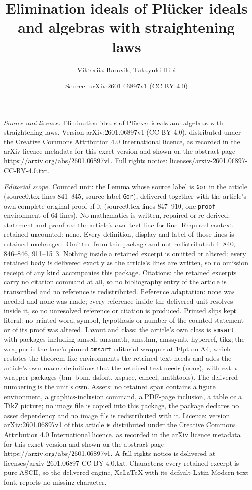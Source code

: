 \documentclass[10pt,a4paper]{amsart}
\title[Elimination ideals of Pl\"ucker ideals and algebras with str]{Elimination ideals of Pl\"ucker ideals and algebras with straightening laws}
\author{Viktoriia Borovik, Takayuki Hibi}
\date{Source: arXiv:2601.06897v1 (CC BY 4.0)}
\begin{document}
\maketitle

\noindent\emph{Source and licence.} Elimination ideals of Pl\"ucker ideals and algebras with straightening laws. Version arXiv:2601.06897v1 (CC BY 4.0), distributed under the Creative Commons Attribution 4.0 International licence, as recorded in the arXiv licence metadata for this exact version and shown on the abstract page https://arxiv.org/abs/2601.06897v1. Full rights notice: licenses/arxiv-2601.06897-CC-BY-4.0.txt.\par\smallskip

\noindent\textit{Editorial scope.} Counted unit: the Lemma whose source label is \texttt{Gor} in the article (source0.tex lines 841--845, source label \texttt{Gor}), delivered together with the article's own complete original proof of it (source0.tex lines 847--910, one \texttt{proof} environment of 64 lines). No mathematics is written, repaired or re-derived: statement and proof are the article's own text line for line. Required context retained uncounted: none. Every definition, display and label of those lines is retained unchanged. Omitted from this package and not redistributed: 1--840, 846--846, 911--1513. Nothing inside a retained excerpt is omitted or altered: every retained body is delivered exactly as the article's lines are written, so no omission receipt of any kind accompanies this package. Citations: the retained excerpts carry no citation command at all, so no bibliography entry of the article is transcribed and no reference is redistributed. Reference adaptation: none was needed and none was made; every reference inside the delivered unit resolves inside it, so no unresolved reference or citation is produced. Printed slips kept literal: no printed word, symbol, hypothesis or number of the counted statement or of its proof was altered. Layout and class: the article's own class is \texttt{amsart} with packages including amscd, amsmath, amsthm, amssymb, hyperref, tikz; the wrapper is the lane's pinned \texttt{amsart} editorial wrapper at 10pt on A4, which restates the theorem-like environments the retained text needs and adds the article's own macro definitions that the retained text needs (none), with extra wrapper packages (bm, bbm, dsfont, xspace, cancel, mathtools). The delivered numbering is the unit's own. Assets: no retained span contains a figure environment, a graphics-inclusion command, a PDF-page inclusion, a table or a TikZ picture; no image file is copied into this package, the package declares no asset dependency and no image file is redistributed with it. Licence: version arXiv:2601.06897v1 of this article is distributed under the Creative Commons Attribution 4.0 International licence, as recorded in the arXiv licence metadata for this exact version and shown on the abstract page https://arxiv.org/abs/2601.06897v1. A full rights notice is delivered at licenses/arxiv-2601.06897-CC-BY-4.0.txt. Characters: every retained excerpt is pure ASCII, so the delivered engine, XeLaTeX with its default Latin Modern text font, reports no missing character.
\end{document}
